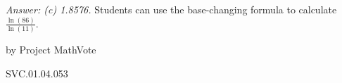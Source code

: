 
{\it Answer:  (c) 1.8576.} Students can use the base-changing formula to calculate $\displaystyle \frac{\ln (86)}{\ln (11)}$.

\medskip
by Project MathVote

SVC.01.04.053


